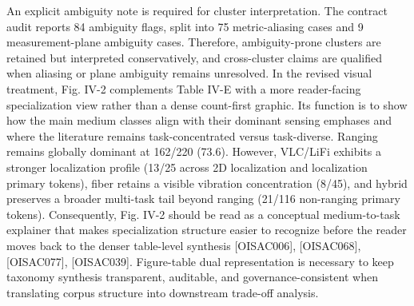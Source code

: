 {}An explicit ambiguity note is required for cluster interpretation. The contract audit reports 84 ambiguity flags, split into 75 metric-aliasing cases and 9 measurement-plane ambiguity cases. Therefore, ambiguity-prone clusters are retained but interpreted conservatively, and cross-cluster claims are qualified when aliasing or plane ambiguity remains unresolved.\markdownRendererParagraphSeparator
{}In the revised visual treatment, Fig. IV-2 complements Table IV-E with a more reader-facing specialization view rather than a dense count-first graphic. Its function is to show how the main medium classes align with their dominant sensing emphases and where the literature remains task-concentrated versus task-diverse. Ranging remains globally dominant at 162/220 (73.6\markdownRendererPercentSign{}). However, VLC/LiFi exhibits a stronger localization profile (13/25 across 2D localization and localization primary tokens), fiber retains a visible vibration concentration (8/45), and hybrid preserves a broader multi-task tail beyond ranging (21/116 non-ranging primary tokens). Consequently, Fig. IV-2 should be read as a conceptual medium-to-task explainer that makes specialization structure easier to recognize before the reader moves back to the denser table-level synthesis [O\markdownRendererUnderscore{}ISAC\markdownRendererUnderscore{}006], [O\markdownRendererUnderscore{}ISAC\markdownRendererUnderscore{}068], [O\markdownRendererUnderscore{}ISAC\markdownRendererUnderscore{}077], [O\markdownRendererUnderscore{}ISAC\markdownRendererUnderscore{}039].\markdownRendererParagraphSeparator
{}\markdownRendererParagraphSeparator
{} Figure-table dual representation is necessary to keep taxonomy synthesis transparent, auditable, and governance-consistent when translating corpus structure into downstream trade-off analysis.\markdownRendererInterblockSeparator
{}
\markdownRendererSectionEnd 
\markdownRendererSectionEnd 
\markdownRendererSectionEnd \markdownRendererSectionBegin
